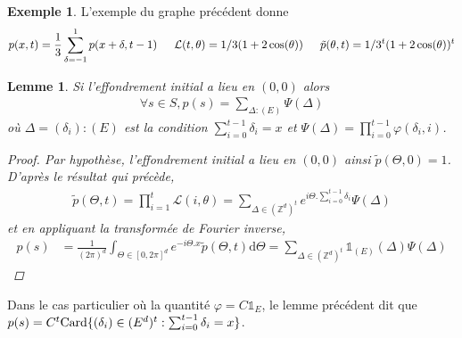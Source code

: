 \documentclass{article}
\newtheorem{lemma}[theorem]{Lemme}
\theoremstyle{definition}
\newtheorem{exmp}{Exemple}[section]
\begin{document}
\begin{exmp}
	L'exemple du graphe précédent donne 
	\begin{align*}
		p(x, t) = \frac{1}{3}\sum_{\delta=-1}^1 p(x+\delta, t-1)\indent \mathcal{L}(t,\theta) = 1/3(1+2\cos(\theta)) \indent \tilde{p}(\theta, t) = 1/3^t(1+2\cos(\theta))^t
	\end{align*}
\end{exmp}
	\begin{lemma}
	Si l'effondrement initial a lieu en $(0,0)$ alors
	\begin{align*}
		\forall s\in S, p(s) = \sum_{\Delta : (E)}  \Psi(\Delta)
	\end{align*}
	où $\Delta = (\delta_i) : (E)$ est la condition $\sum_{i=0}^{t-1}\delta_{i} = x$ et $\Psi(\Delta) = \prod_{i=0}^{t-1}\varphi(\delta_i,i)$.
	\begin{proof}
		Par hypothèse, l'effondrement initial a lieu en $(0,0)$ ainsi $\tilde{p}(\Theta, 0) = 1$. D'après le résultat qui précède, 
		\begin{align*} \tilde{p}(\Theta, t) = \prod_{i=1}^{t}\mathcal{L}(i,\theta) = \sum_{\Delta\in (\mathbb{Z}^d)^{t}} e^{i\Theta.\sum_{i=0}^{t-1} \delta_i}\Psi(\Delta)\end{align*}
			et en appliquant la transformée de Fourier inverse, 
			\begin{align*}
				p(s) &= \frac{1}{(2\pi)^d}\int_{\Theta\in [0,2\pi]^d} e^{-i\Theta.x} \tilde{p}(\Theta, t)\mathrm{d}\Theta = \sum_{\Delta \in (\mathbb{Z}^d)^t} \mathds{1}_{(E)}(\Delta)\Psi(\Delta)
		\end{align*} 
	\end{proof}\end{lemma}
	Dans le cas particulier où la quantité $\varphi=C\mathds{1}_E$, le lemme précédent dit que $p(s) = C^t\textup{Card}\{(\delta_i)\in (E^d)^t : \sum_{i=0}^{t-1}\delta_i=x\}$. %
\end{document}
